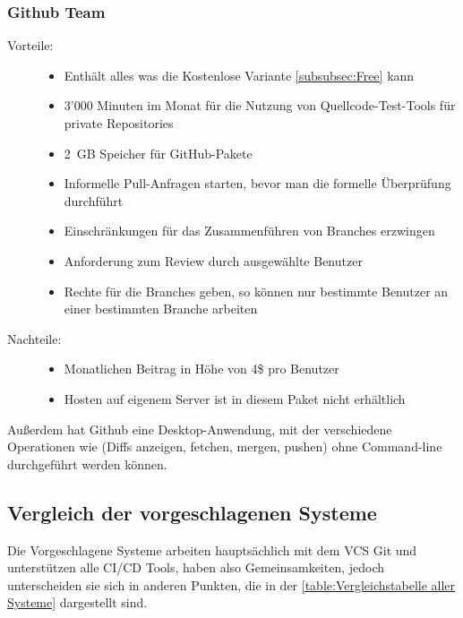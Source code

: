 \subsubsection{Github Team}
\label{subsubsec:Team}

\begin{description}
	\item [Vorteile:] \hfill
	\begin{itemize}
		\item Enthält alles was die Kostenlose Variante \cref{subsubsec:Free} kann
		\item 3'000 Minuten im Monat für die Nutzung von Quellcode-Test-Tools für private Repositories
		\item 2~GB Speicher für GitHub-Pakete
		\item Informelle Pull-Anfragen starten, bevor man die formelle Überprüfung durchführt
		\item Einschränkungen für das Zusammenführen von Branches erzwingen
		\item Anforderung zum Review durch ausgewählte Benutzer
		\item Rechte für die Branches geben, so können nur bestimmte Benutzer an einer bestimmten Branche arbeiten
	\end{itemize}
	\item [Nachteile:] \hfill
	\begin{itemize}
		\item Monatlichen Beitrag in Höhe von 4\$ pro Benutzer
		\item Hosten auf eigenem Server ist in diesem Paket nicht erhältlich
	\end{itemize}
\end{description}

Außerdem hat Github eine Desktop-Anwendung, mit der verschiedene Operationen wie (Diffs anzeigen, fetchen, mergen, pushen) ohne Command-line durchgeführt werden können.

\subsection{Vergleich der vorgeschlagenen Systeme}
\label{subsec:Vergleichstabelle}

Die Vorgeschlagene Systeme arbeiten hauptsächlich mit dem \ac{VCS} Git und unterstützen alle \ac{CI}/\ac{CD} Tools, haben also Gemeinsamkeiten, jedoch unterscheiden sie sich in anderen Punkten, die in der \cref{table:Vergleichstabelle aller Systeme} dargestellt sind.

